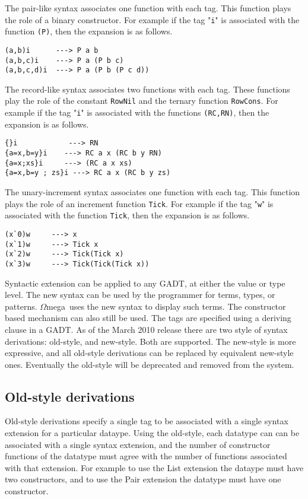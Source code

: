 \documentclass[11pt,twoside]{article}
\newcommand{\om}{$\Omega$mega}
\begin{document}
The pair-like syntax associates one function with each
tag. This function plays the role of a binary constructor.
For example if the tag "{\tt i}" is associated with
the function {\tt (P)}, then the expansion is as follows.
\begin{verbatim}
(a,b)i      ---> P a b
(a,b,c)i    ---> P a (P b c)
(a,b,c,d)i  ---> P a (P b (P c d))
\end{verbatim}

The record-like syntax associates two functions with each
tag. These functions play the role of the constant {\tt RowNil} and 
the ternary function {\tt RowCons}.
For example if the tag "{\tt i}" is associated with
the functions {\tt (RC,RN)}, then the expansion is as follows.
\begin{verbatim}
{}i            ---> RN
{a=x,b=y}i    ---> RC a x (RC b y RN)
{a=x;xs}i     ---> (RC a x xs)
{a=x,b=y ; zs}i ---> RC a x (RC b y zs)
\end{verbatim}

The unary-increment syntax associates one function with each tag. This function
plays the role of an increment function {\tt Tick}. 
For example if the tag "{\tt w}" is associated with
the function {\tt Tick}, then the expansion is as follows.
\begin{verbatim}
(x`0)w     ---> x
(x`1)w     ---> Tick x
(x`2)w     ---> Tick(Tick x)
(x`3)w     ---> Tick(Tick(Tick x))
\end{verbatim}



Syntactic extension can be applied to any GADT, at either the value or type level. The
new syntax can be used by the programmer for terms, types, or patterns. \om\ uses the
new syntax to display such terms. The constructor based mechanism can also still
be used. The tags are specified using a deriving clause in a GADT. As of the March 2010
release there are two style of syntax derivations: old-style, and new-style. Both are
supported. The new-style is more expressive, and all old-style derivations
can be replaced by equivalent new-style ones. Eventually the old-style will
be deprecated and removed from the system.

\subsection{Old-style derivations}

Old-style derivations specify a single tag to be associated with a single syntax
extension for a particular dataype. Using the old-style, each datatype can can be associated with a
single syntax extension, and the number of constructor functions of the datatype
must agree with the number of functions associated with that extension. For example
to use the List extension the dataype must have two constructors, and to use the Pair
extension the datatype must have one constructor.
\end{document}
